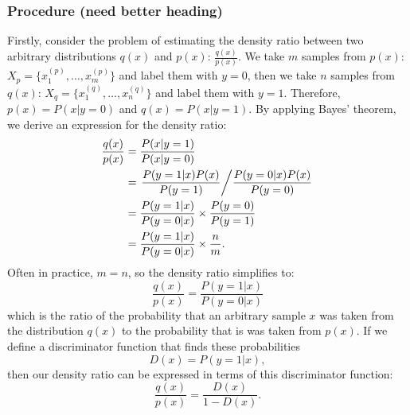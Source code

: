\documentclass[a4paper,12pt]{article}
\numberwithin{equation}{section}
\begin{document}
\subsubsection{Procedure (need better heading)}
Firstly, consider the problem of estimating the density ratio between two arbitrary distributions $q(x)$ and $p(x)$: $\frac{q(x)}{p(x)}$. We take $m$ samples from $p(x)$: $X_p=\{x_1^{(p)},\dots,x_m^{(p)}\}$
and label them with $y=0$, then we take $n$ samples from $q(x)$: $X_q=\{x_1^{(q)},\dots, x_n^{(q)}\}$ and label them with $y=1$. Therefore, $p(x)=P(x|y=0)$ and $q(x)=P(x|y=1)$. By applying Bayes' theorem, we derive an expression for the density ratio:
\begin{align*}
\frac{q(x)}{p(x)}&= \frac{P(x|y=1)}{P(x|y=0)}\\
&= \left.\frac{P(y=1|x)P(x)}{P(y=1)}\middle/ \frac{P(y=0|x)P(x)}{P(y=0)}\right.\\
&= \frac{P(y=1|x)}{P(y=0|x)}\times \frac{P(y=0)}{P(y=1)}\\
&= \frac{P(y=1|x)}{P(y=0|x)}\times \frac{n}{m}.
\end{align*}
Often in practice, $m=n$, so the density ratio simplifies to:
\[\frac{q(x)}{p(x)}=\frac{P(y=1|x)}{P(y=0|x)}\]
which is the ratio of the probability that an arbitrary sample $x$ was taken from the distribution $q(x)$ to the probability that is was taken from $p(x)$. If we define a discriminator function that finds these probabilities
\[D(x)=P(y=1|x),\]
then our density ratio can be expressed in terms of this discriminator function:
\[\frac{q(x)}{p(x)}=\frac{D(x)}{1-D(x)}.\]
\newpage
\end{document}
